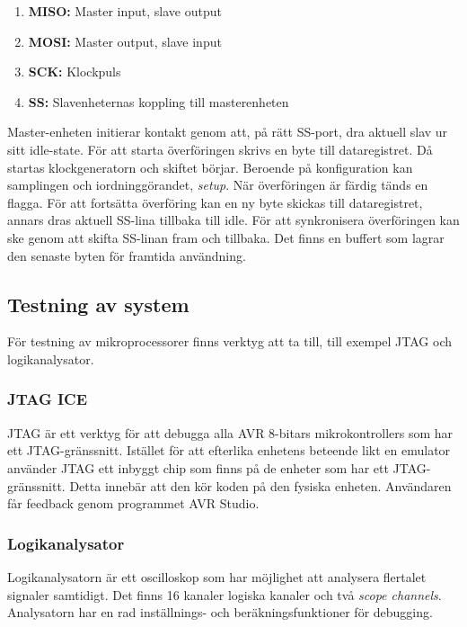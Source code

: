 \documentclass[11pt]{article}
\begin{document}
\begin{flushleft}
\begin{enumerate}
	\item \textbf{MISO:} Master input, slave output
	\item \textbf{MOSI:} Master output, slave input
	\item \textbf{SCK:} Klockpuls
	\item \textbf{SS:} Slavenheternas koppling till masterenheten
\end{enumerate}

Master-enheten initierar kontakt genom att, på rätt SS-port, dra aktuell slav ur sitt idle-state. För att starta överföringen skrivs en byte till dataregistret. Då startas klockgeneratorn och skiftet börjar. Beroende på konfiguration kan samplingen och iordninggörandet, \textit{setup}. När överföringen är färdig tänds en flagga. För att fortsätta överföring kan en ny byte skickas till dataregistret, annars dras aktuell SS-lina tillbaka till idle. För att synkronisera överföringen kan ske genom att skifta SS-linan fram och tillbaka. Det finns en buffert som lagrar den senaste byten för framtida användning.\cite{ATMega16}

\subsection{Testning av system} 

För testning av mikroprocessorer finns verktyg att ta till, till exempel JTAG och logikanalysator.

\subsubsection{JTAG ICE}

JTAG är ett verktyg för att debugga alla AVR 8-bitars mikrokontrollers som har ett JTAG-gränssnitt. Istället för att efterlika enhetens beteende likt en emulator använder JTAG ett inbyggt chip som finns på de enheter som har ett JTAG-gränssnitt. Detta innebär att den kör koden på den fysiska enheten. Användaren får feedback genom programmet AVR Studio. \cite{guideJTAG}

\subsubsection{Logikanalysator}

Logikanalysatorn är ett oscilloskop som har möjlighet att analysera flertalet signaler samtidigt. Det finns 16 kanaler logiska kanaler och  två \textit{scope channels}. Analysatorn har en rad inställnings- och beräkningsfunktioner för debugging. \cite{guideLogic}


\end{flushleft}
\end{document}
